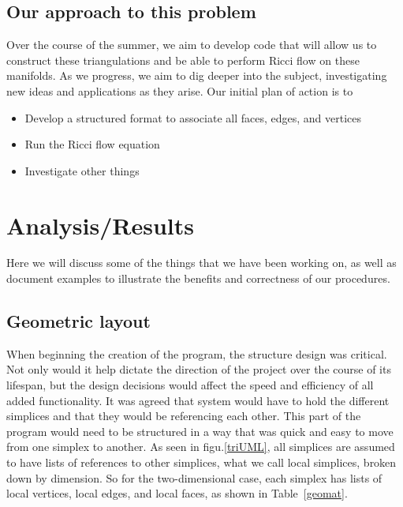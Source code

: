 \documentclass[12pt]{article}
\begin{document}
\subsection{Our approach to this problem}
\maketitle

Over the course of the summer, we aim to develop code that will allow us to construct these triangulations and be able to perform Ricci flow on these manifolds. As we progress, we aim to dig deeper into the subject, investigating new ideas and applications as they arise. Our initial plan of action is to

\begin{itemize}
\item Develop a structured format to associate all faces, edges, and vertices
\item Run the Ricci flow equation
\item Investigate other things
\end{itemize}  

\newpage
\section{Analysis/Results}
\maketitle
  Here we will discuss some of the things that we have been working on, as well as document examples to illustrate the benefits and correctness of our procedures. 
  
  \subsection{Geometric layout}
  \maketitle
  
When beginning the creation of the program, the structure design was critical. Not only would it help dictate the direction of the project over the course of its lifespan, but the design decisions would affect the speed and efficiency of all added functionality. It was agreed that system would have to hold the different simplices and that they would be referencing each other. This part of the program would need to be structured in a way that was quick and easy to move from one simplex to another. As seen in figu.\ref{triUML}, all simplices are assumed to have lists of references to other simplices, what we call local simplices, broken down by dimension. So for the two-dimensional case, each simplex has lists of local vertices, local edges, and local faces, as shown in Table~\ref{geomat}.\newline
\end{document}
